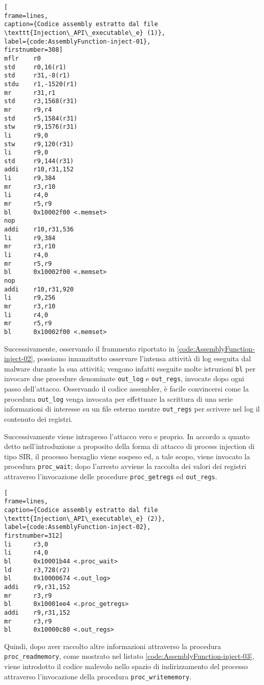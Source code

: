 \documentclass[10pt,a4paper, titlepage]{report}
\begin{document}
\begin{lstlisting}[
frame=lines, 
caption={Codice assembly estratto dal file \texttt{Injection\_API\_executable\_e} (1)}, 
label={code:AssemblyFunction-inject-01},
firstnumber=308]
mflr    r0
std     r0,16(r1)
std     r31,-8(r1)
stdu    r1,-1520(r1)
mr      r31,r1
std     r3,1568(r31)
mr      r9,r4
std     r5,1584(r31)
stw     r9,1576(r31)
li      r9,0
stw     r9,120(r31)
li      r9,0
std     r9,144(r31)
addi    r10,r31,152
li      r9,384
mr      r3,r10
li      r4,0
mr      r5,r9
bl      0x10002f00 <.memset>
nop
addi    r10,r31,536
li      r9,384
mr      r3,r10
li      r4,0
mr      r5,r9
bl      0x10002f00 <.memset>
nop
addi    r10,r31,920
li      r9,256
mr      r3,r10
li      r4,0
mr      r5,r9
bl      0x10002f00 <.memset>
\end{lstlisting}

Successivamente, osservando il frammento riportato in \ref{code:AssemblyFunction-inject-02}, possiamo innanzitutto osservare l'intensa attività di log eseguita dal malware durante la sua attività; vengono infatti eseguite molte istruzioni \texttt{bl} per invocare due procedure denominate \texttt{out\_log} e \texttt{out\_regs}, invocate dopo ogni passo dell'attacco. Osservando il codice assembler, è facile convincersi come la procedura \texttt{out\_log} venga invocata per effettuare la scrittura di una serie informazioni di interesse su un file esterno mentre \texttt{out\_regs} per scrivere nel log il contenuto dei registri.

Successivamente viene intrapreso l'attacco vero e proprio. In accordo a quanto detto nell'introduzione a proposito della forma di attacco di process injection di tipo SIR, il processo bersaglio viene sospeso ed, a tale scopo, viene invocato la procedura \texttt{proc\_wait}; dopo l'arresto avviene la raccolta dei valori dei registri attraverso l'invocazione delle procedure  \texttt{proc\_getregs} ed \texttt{out\_regs}.

\begin{lstlisting}[
frame=lines, 
caption={Codice assembly estratto dal file \texttt{Injection\_API\_executable\_e} (2)}, 
label={code:AssemblyFunction-inject-02},
firstnumber=312]
li      r3,0
li      r4,0
bl      0x10001b44 <.proc_wait>
ld      r3,728(r2)
bl      0x10000674 <.out_log>
addi    r9,r31,152
mr      r3,r9
bl      0x10001ee4 <.proc_getregs>
addi    r9,r31,152
mr      r3,r9
bl      0x10000c80 <.out_regs>
\end{lstlisting}

Quindi, dopo aver raccolto altre informazioni attraverso la procedura \texttt{proc\_readmemory}, come mostrato nel listato \ref{code:AssemblyFunction-inject-03}, viene introdotto il codice malevolo nello spazio di indirizzamento del processo attraverso l'invocazione della procedura \texttt{proc\_writememory}.
\end{document}
